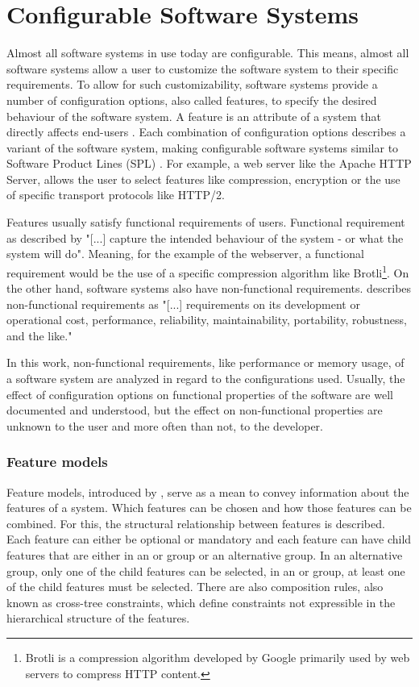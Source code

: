 \documentclass[../../thesis.tex]{subfiles}
\begin{document}
\section{Configurable Software Systems}
Almost all software systems in use today are configurable. This means, almost all software systems
allow a user to customize the software system to their specific requirements.
To allow for such customizability, software systems provide a number of configuration options,
also called features, to specify the desired behaviour of the software system.
A feature is an attribute of a system that directly affects end-users \cite{kang1990feature}.
Each combination of configuration options describes a variant of the software system, making configurable software systems similar to
Software Product Lines (SPL) \cite{siegmund2012spl}.
For example, a web server like the Apache HTTP Server, allows the user to select features like 
compression, encryption or the use of
specific transport protocols like HTTP/2.

Features usually satisfy functional requirements \cite{siegmund2012spl} of users. Functional requirement as described
by  "[...] capture the intended behaviour of the system - or what the system will do".
Meaning, for the example of the webserver, a functional requirement would be the use of a specific compression algorithm like
Brotli\footnote{Brotli is a compression algorithm developed by Google primarily used by web servers to compress HTTP content. }.
On the other hand, software systems also have non-functional requirements.  describes non-functional
requirements as  "[...] requirements on its development or operational cost, performance, reliability,
maintainability, portability, robustness, and the like."

In this work, non-functional requirements, like performance or memory usage, of a software system are analyzed in regard to the configurations used.
Usually, the effect of configuration options on functional properties of the software are well documented and understood,
but the effect on non-functional properties are unknown to the user and more often than not, to the developer.


\subsubsection{Feature models} \label{sec:basics:feature_model}
Feature models, introduced by , serve as a mean to convey information about the features of a system.
Which features can be chosen and how those features can be combined. For this, the structural relationship between features is described.
Each feature can either be optional or mandatory and each feature can have child features that are either in an or group or an alternative group.
In an alternative group, only one of the child features can be selected, in an or group, at least one of the child features must be selected.
There are also composition rules, also known as cross-tree constraints, which define constraints not expressible in the hierarchical structure
of the features.
\end{document}
